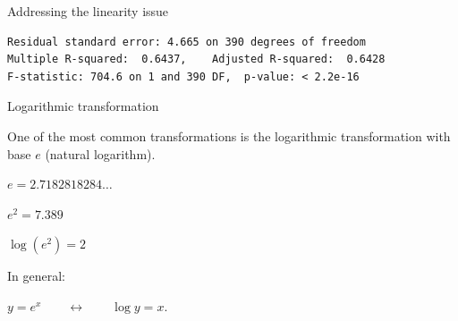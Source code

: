 \documentclass{beamer}\usepackage[]{graphicx}\usepackage[]{color}
\makeatletter
\newcommand{\hlstr}[1]{\textcolor[rgb]{1,0.894,0.71}{#1}}%
\newcommand{\hlopt}[1]{\textcolor[rgb]{1,0.894,0.769}{#1}}%
\newcommand{\hlstd}[1]{\textcolor[rgb]{1,0.894,0.769}{#1}}%
\newcommand{\hlkwc}[1]{\textcolor[rgb]{0.78,0.941,0.545}{#1}}%
\newcommand{\hlkwd}[1]{\textcolor[rgb]{1,0.78,0.769}{#1}}%
\newenvironment{kframe}{%
 \def\at@end@of@kframe{}%
 \ifinner\ifhmode%
  \def\at@end@of@kframe{\end{minipage}}%
  \begin{minipage}{\columnwidth}%
 \fi\fi%
 \def\FrameCommand##1{\hskip\@totalleftmargin \hskip-\fboxsep
 \colorbox{shadecolor}{##1}\hskip-\fboxsep
     \hskip-\linewidth \hskip-\@totalleftmargin \hskip\columnwidth}%
 \MakeFramed {\advance\hsize-\width
   \@totalleftmargin\z@ \linewidth\hsize
   \@setminipage}}%
 {\par\unskip\endMakeFramed%
 \at@end@of@kframe}
\newenvironment{knitrout}{}{} %
\makeatother
\begin{document}
\begin{darkframes}
\begin{frame}[fragile]{Addressing the linearity issue}
\begin{knitrout}
\begin{kframe}
\begin{verbatim}
Residual standard error: 4.665 on 390 degrees of freedom
Multiple R-squared:  0.6437,	Adjusted R-squared:  0.6428 
F-statistic: 704.6 on 1 and 390 DF,  p-value: < 2.2e-16
\end{verbatim}
\end{kframe}
\end{knitrout}
    \end{frame}
    
    
    
    
    
    \begin{frame}[fragile]{Logarithmic transformation}
      \begin{center}
        One of the most common transformations is the logarithmic transformation with base $e$ (natural logarithm). \bigskip \pause
        
        $e=2.7182818284\ldots$ \bigskip \pause
        
        $e^2 = 7.389$ \bigskip \pause
        
        $\log(e^2) = 2$ \bigskip \pause
        
        In general:
        
        $y=e^x \qquad\longleftrightarrow\qquad \log y = x$.
      
      \end{center}
        
    \end{frame}
    

\end{darkframes}
\end{document}
